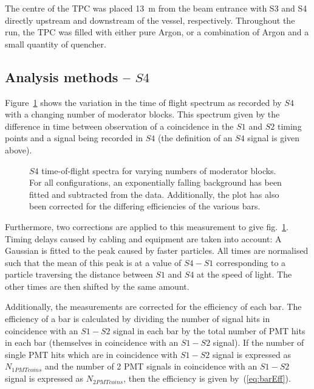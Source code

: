     The centre of the TPC was placed 13~m from the beam entrance with S3 and S4 directly upstream and downstream of the vessel, respectively.
    Throughout the run, the TPC was filled with either pure Argon, or a combination of Argon and a small quantity of quencher.
    
	\subsection{Analysis methods -- $S4$}

	Figure~\ref{fig:s4tof} shows the variation in the time of flight spectrum as recorded by $S4$ with a changing number of moderator blocks. 
	This spectrum given by the difference in time between observation of a coincidence in the $S1$ and $S2$ timing points and a signal being recorded in $S4$ (the definition of an $S4$ signal is given above).
	
	\begin{figure}[h]
		\begin{adjustbox}{max totalsize={.8\textwidth}{.7\textheight},center}
			
		\end{adjustbox}
		\caption{$S4$ time-of-flight spectra for varying numbers of moderator blocks. For all configurations, an exponentially falling background has been fitted and subtracted from the data. Additionally, the plot has also been corrected for the differing efficiencies of the various bars.}
		\label{fig:s4tof}	
	\end{figure}

	Furthermore, two corrections are applied to this measurement to give fig.~\ref{fig:s4tof}. 
	Timing delays caused by cabling and equipment are taken into account:
	A Gaussian is fitted to the peak caused by faster particles.
	All times are normalised such that the mean of this peak is at a value of $S4 - S1$ corresponding to a particle traversing the distance between $S1$ and $S4$ at the speed of light. 
	The other times are then shifted by the same amount.
	
	Additionally, the measurements are corrected for the efficiency of each bar. 
	The efficiency of a bar is calculated by dividing the number of signal hits in coincidence with an $S1-S2$ signal in each bar by the total number of PMT hits in each bar (themselves in coincidence with an $S1-S2$ signal). 
	If the number of single PMT hits which are in coincidence with $S1-S2$ signal is expressed as $N_{1PMTcoins}$ and the number of 2 PMT signals in coincidence with an $S1-S2$ signal is expressed as $N_{2PMTcoins}$, then the efficiency is given by~(\ref{eq:barEff}).
	
